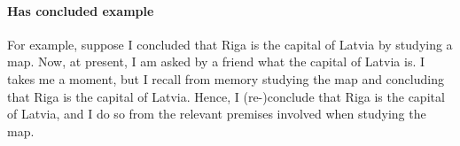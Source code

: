 










\paragraph{Has concluded example}

\begin{note}
  For example, suppose I concluded that Riga is the capital of Latvia by studying a map.
  Now, at present, I am asked by a friend what the capital of Latvia is.
  I takes me a moment, but I recall from memory studying the map and concluding that Riga is the capital of Latvia.
  Hence, I (re-)conclude that Riga is the capital of Latvia, and I do so from the relevant premises involved when studying the map.
\end{note}

